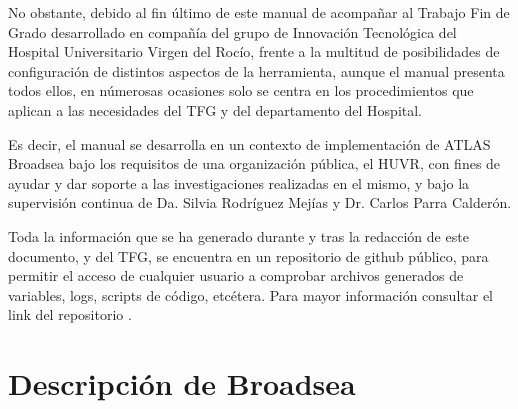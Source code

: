 
No obstante, debido al fin último de este manual de acompañar al Trabajo Fin de Grado desarrollado en compañía del grupo de Innovación Tecnológica del Hospital Universitario Virgen del Rocío,  frente a la multitud de posibilidades de configuración de distintos aspectos de la herramienta, aunque el manual presenta todos ellos, en númerosas ocasiones solo se centra en los procedimientos que aplican a las necesidades del TFG y del departamento del Hospital.

Es decir, el manual se desarrolla en un contexto de implementación de ATLAS Broadsea bajo los requisitos de una organización pública, el HUVR, con fines de ayudar y dar soporte a las investigaciones realizadas en el mismo, y bajo la supervisión continua de Da. Silvia Rodríguez Mejías y Dr. Carlos Parra Calderón.


Toda la información que se ha generado durante y tras la redacción de este documento, y del TFG, se encuentra en un repositorio de github público, para permitir el acceso de cualquier usuario a comprobar archivos generados de variables, logs, scripts de código, etcétera. Para mayor información consultar el link del repositorio \cite{vallealonsodc}.

\section{Descripción de Broadsea} \label{sec:01descripBroadsea}



